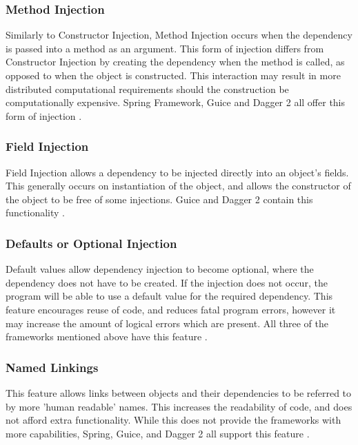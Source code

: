 \documentclass[12pt,twocolumn]{IEEEtran}
\begin{document}
\subsubsection{Method Injection} %

Similarly to Constructor Injection, Method Injection occurs when the dependency is passed into a method as an argument. This form of injection differs from Constructor Injection by creating the dependency when the method is called, as opposed to when the object is constructed. This interaction may result in more distributed computational requirements should the construction be computationally expensive. Spring Framework, Guice and Dagger 2 all offer this form of injection \cite{guicewiki2014,spring2019,dagger2019}. 

\subsubsection{Field Injection} %

Field Injection allows a dependency to be injected directly into an object's fields. This generally occurs on instantiation of the object, and allows the constructor of the object to be free of some injections. Guice and Dagger 2 contain this functionality \cite{guicewiki2014,dagger2019}.

\subsubsection{Defaults or Optional Injection} %
Default values allow dependency injection to become optional, where the dependency does not have to be created. If the injection does not occur, the program will be able to use a default value for the required dependency. This feature encourages reuse of code, and reduces fatal program errors, however it may increase the amount of logical errors which are present. All three of the frameworks mentioned above have this feature \cite{guicewiki2014,spring2019,dagger2019}.

\subsubsection{Named Linkings} %
This feature allows links between objects and their dependencies to be referred to by more 'human readable' names. This increases the readability of code, and does not afford extra functionality. While this does not provide the frameworks with more capabilities, Spring, Guice, and Dagger 2 all support this feature \cite{guicewiki2014,spring2019,dagger2019}.
\end{document}
